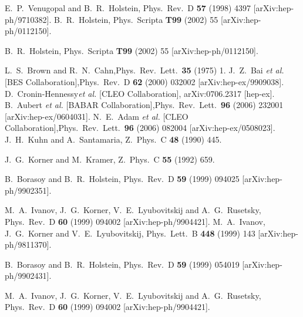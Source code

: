 \documentclass{article}
\begin{document}
\begin{thebibliography}{99}
 E.~P.~Venugopal and B.~R.~Holstein,
Phys.\ Rev.\  D {\bf 57} (1998) 4397 [arXiv:hep-ph/9710382].
 B.~R.~Holstein,
 Phys.\ Scripta {\bf T99} (2002) 55 [arXiv:hep-ph/0112150].

 B.~R.~Holstein,
 Phys.\ Scripta {\bf T99} (2002) 55 [arXiv:hep-ph/0112150].

 L.~S.~Brown and R.~N.~Cahn,Phys.\ Rev.\ Lett.\  {\bf 35} (1975) 1.%
 J.~Z.~Bai {\it et al.}  [BES Collaboration],Phys.\ Rev.\  D {\bf 62} (2000) 032002 [arXiv:hep-ex/9909038].%
 D.~Cronin-Hennessy{\it et al.} [CLEO Collaboration], arXiv:0706.2317 [hep-ex].%
 B.~Aubert {\it et al.}  [BABAR Collaboration],Phys.\ Rev.\ Lett.\  {\bf 96} (2006) 232001 [arXiv:hep-ex/0604031].%
 N.~E.~Adam {\it et al.}  [CLEO Collaboration],Phys.\ Rev.\ Lett.\  {\bf 96} (2006) 082004 [arXiv:hep-ex/0508023].%
 J.~H.~Kuhn and A.~Santamaria,
Z.\ Phys.\  C {\bf 48} (1990) 445.

J.~G.~Korner and M.~Kramer,
Z.\ Phys.\  C {\bf 55} (1992) 659.

B.~Borasoy and B.~R.~Holstein,
Phys.\ Rev.\  D {\bf 59} (1999) 094025 [arXiv:hep-ph/9902351].

M.~A.~Ivanov, J.~G.~Korner, V.~E.~Lyubovitskij and A.~G.~Rusetsky,
Phys.\ Rev.\  D {\bf 60} (1999) 094002
[arXiv:hep-ph/9904421].
M.~A.~Ivanov, J.~G.~Korner and V.~E.~Lyubovitskij,
Phys.\ Lett.\  B {\bf 448} (1999) 143 [arXiv:hep-ph/9811370].

B.~Borasoy and B.~R.~Holstein,
Phys.\ Rev.\  D {\bf 59} (1999) 054019 [arXiv:hep-ph/9902431].

M.~A.~Ivanov, J.~G.~Korner, V.~E.~Lyubovitskij and A.~G.~Rusetsky,
Phys.\ Rev.\  D {\bf 60} (1999) 094002
[arXiv:hep-ph/9904421].

\end{thebibliography}
\end{document}
